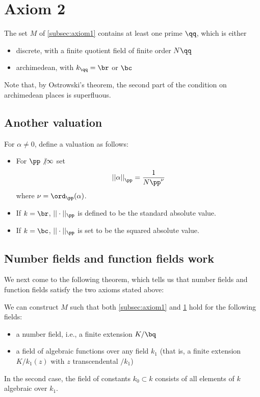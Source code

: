 \section{Axiom 2}
\label{sec:orgheadline20}
The set \(M\) of \ref{subsec:axiom1} contains at least one prime \(\qq\), which is either
\begin{itemize}
\item discrete, with a finite quotient field of finite order \(N\qq\)
\item archimedean, with \(k_\qq=\br\) or \(\bc\)
\end{itemize}

Note that, by Ostrowski's theorem, the second part of the condition on
archimedean places is superfluous.

\subsection{Another valuation}
\label{sec:orgheadline21}
For \(\alpha\neq 0\), define a valuation as follows:
\begin{itemize}
\item For \(\pp \not | \infty\) set
  \[ { ||\alpha|| }_\pp = \frac1{ N\pp^\nu } \]
  where \(\nu = \ord_\pp(\alpha)\).
\item If \(k=\br\), \(||\cdot||_\pp\) is defined to be the standard absolute value.
\item If \(k=\bc\), \(||\cdot||_\pp\) is set to be the squared absolute value.
\end{itemize}

\subsection{Number fields and function fields work}
We next come to the following theorem, which tells us that number fields and
function fields satisfy the two axioms stated above:

\begin{thm}
  We can construct \(M\) such that both \ref{subsec:axiom1} and
  \ref{sec:orgheadline20} hold for the following fields:
  \begin{itemize}
  \item a number field, i.e., a finite extension \(K/\bq\)
  \item a field of algebraic functions over any field \(k_1\) (that is, a finite
    extension \(K/k_1(z)\) with \(z\) transcendental \(/k_1\))
  \end{itemize}
In the second case, the field of constants $k_0 \subset k$ consists of all
elements of $k$ algebraic over $k_1$.
\end{thm}

